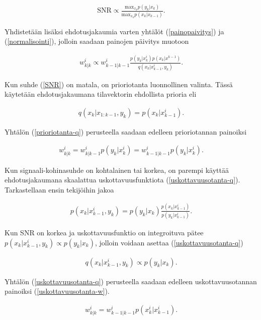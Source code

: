 \documentclass[
  12pt,
  a4paper, twoside]{book}
\begin{document}
\begin{align}\label{SNR}
\text{SNR}\propto \frac{\text{max}_{x_k}p(y_k|x_k)}{\text{max}_{x_k}p(x_k|x_{k-1})}. 
\end{align}

\noindent Yhdistetään lisäksi ehdotusjakaumia varten yhtälöt (\ref{painopaivitys}) ja (\ref{normalisointi}), jolloin saadaan painojen päivitys muotoon

\begin{align}\label{painopaivitys-propto}
w^i_{k|k} \propto w^i_{k-1|k-1}\frac{p(y_k|x^i_k)p(x_k|x^{k-1})}{q(x_k|x^i_{k-1},y_k)}.
\end{align}

Kun suhde (\ref{SNR}) on matala, on prioriotanta luonnollinen valinta. Tässä käytetään ehdotusjakaumana tilavektorin ehdollista prioria eli

\begin{align}\label{prioriotanta-q}
q(x_k|x_{1:k-1},y_{k})=p(x_k|x^i_{k-1}).
\end{align}

\noindent Yhtälön (\ref{prioriotanta-q}) perusteella saadaan edelleen prioriotannan painoiksi

\begin{align}\label{prioriotanta-w}
w^i_{k|k} = w^i_{k|k-1}p(y_k|x^i_k) = w^i_{k-1|k-1}p(y_k|x^i_k).
\end{align}

Kun signaali-kohinasuhde on kohtalainen tai korkea, on parempi käyttää ehdotusjakaumana skaalattua uskottavuusfunktiota (\ref{uskottavuusotanta-q}). Tarkastellaan ensin tekijöihin jakoa

\begin{align}\label{uskottavuusotanta-factorization}
p(x_k|x^i_{k-1},y_k)=p(y_k|x_k)\frac{p(x_k|x^i_{k-1})}{p(y_k|x^i_{k-1})}.
\end{align}

\noindent Kun SNR on korkea ja uskottavuusfunktio on integroituva pätee \(p(x_k|x^i_{k-1},y_{k}) \propto p(y_k|x_k)\), jolloin voidaan asettaa (\ref{uskottavuusotanta-q})

\begin{align}\label{uskottavuusotanta-q}
q(x_k|x^i_{k-1},y_{k}) \propto p(y_k|x_k).
\end{align}

\noindent Yhtälön (\ref{uskottavuusotanta-q}) perusteella saadaan edelleen uskottavuusotannan painoiksi (\ref{uskottavuusotanta-w}).

\begin{align}\label{uskottavuusotanta-w}
w^i_{k|k} = w^i_{k-1|k-1}p(x^i_k|x^i_{k-1}).
\end{align}
\end{document}
